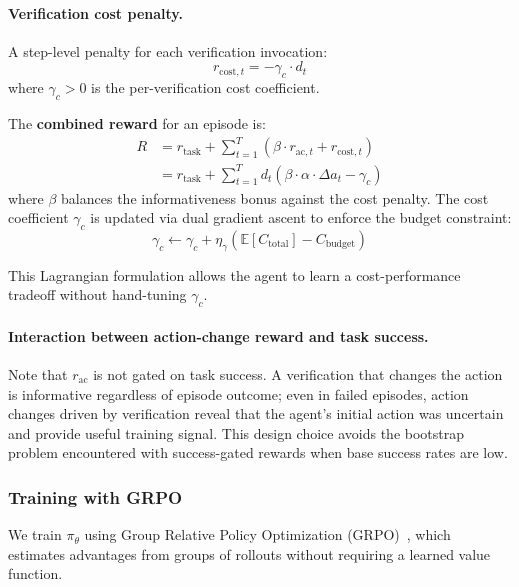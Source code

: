 \paragraph{Verification cost penalty.} A step-level penalty for each verification invocation:
\begin{equation}
r_{\text{cost}, t} = -\gamma_c \cdot d_t
\label{eq:cost-penalty}
\end{equation}
where $\gamma_c > 0$ is the per-verification cost coefficient.

The \textbf{combined reward} for an episode is:
\begin{align}
R &= r_{\text{task}} + \sum_{t=1}^{T}\left(\beta \cdot r_{\text{ac}, t} + r_{\text{cost}, t}\right) \nonumber \\
  &= r_{\text{task}} + \sum_{t=1}^{T} d_t \left(\beta \cdot \alpha \cdot \Delta a_t - \gamma_c\right)
\label{eq:combined-reward}
\end{align}
where $\beta$ balances the informativeness bonus against the cost penalty. The cost coefficient $\gamma_c$ is updated via dual gradient ascent to enforce the budget constraint:
\begin{equation}
\gamma_c \leftarrow \gamma_c + \eta_\gamma \left(\mathbb{E}[C_{\text{total}}] - C_{\text{budget}}\right)
\label{eq:lagrangian-update}
\end{equation}

This Lagrangian formulation allows the agent to learn a cost-performance tradeoff without hand-tuning $\gamma_c$.

\paragraph{Interaction between action-change reward and task success.} Note that $r_{\text{ac}}$ is not gated on task success. A verification that changes the action is informative regardless of episode outcome; even in failed episodes, action changes driven by verification reveal that the agent's initial action was uncertain and provide useful training signal. This design choice avoids the bootstrap problem encountered with success-gated rewards when base success rates are low.

\subsubsection{Training with GRPO}

We train $\pi_\theta$ using Group Relative Policy Optimization (GRPO)~\cite{shao2024deepseekmath}, which estimates advantages from groups of rollouts without requiring a learned value function.


